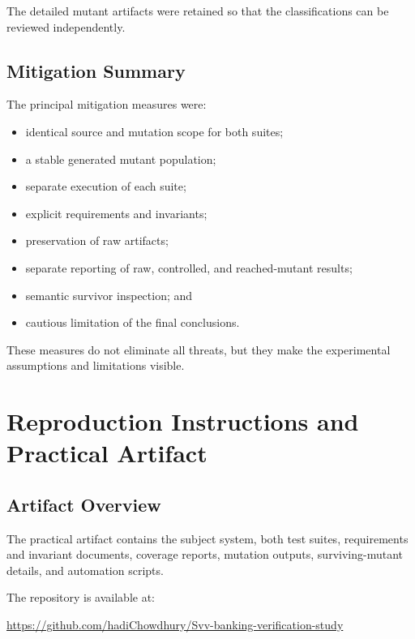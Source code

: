 \documentclass[12pt]{article}
\begin{document}
The detailed mutant artifacts were retained so that the classifications can be
reviewed independently.

\subsection{Mitigation Summary}

The principal mitigation measures were:

\begin{itemize}
    \item identical source and mutation scope for both suites;
    \item a stable generated mutant population;
    \item separate execution of each suite;
    \item explicit requirements and invariants;
    \item preservation of raw artifacts;
    \item separate reporting of raw, controlled, and reached-mutant results;
    \item semantic survivor inspection; and
    \item cautious limitation of the final conclusions.
\end{itemize}

These measures do not eliminate all threats, but they make the experimental
assumptions and limitations visible.


\section{Reproduction Instructions and Practical Artifact}

\subsection{Artifact Overview}

The practical artifact contains the subject system, both test suites,
requirements and invariant documents, coverage reports, mutation outputs,
surviving-mutant details, and automation scripts.

The repository is available at:

\begin{center}
\url{https://github.com/hadiChowdhury/Svv-banking-verification-study}
\end{center}
\end{document}
